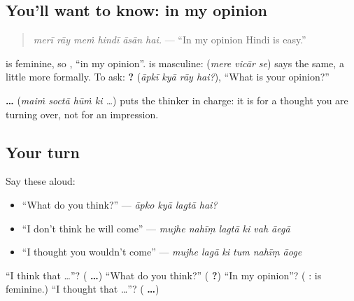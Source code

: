 \subsection*{You'll want to know: in my opinion}
\begin{quote}
\textbf{     }
\end{quote}

\begin{quote}
\emph{merī rāy meṁ hindī āsān hai.} — \textquotedblleft{}In my opinion Hindi is easy.\textquotedblright{}
\end{quote}

\textbf{} is feminine, so \textbf{  }, \textquotedblleft{}in my opinion\textquotedblright{}. \textbf{} is masculine: \textbf{  } (\emph{mere vicār se}) says the same, a little more formally. To ask: \textbf{   ?} (\emph{āpkī kyā rāy hai?}), \textquotedblleft{}What is your opinion?\textquotedblright{}

\textbf{    …} (\emph{maiṁ soctā hūṁ ki …}) puts the thinker in charge: it is for a thought you are turning over, not for an impression.

\subsection*{Your turn}
Say these aloud:

\begin{itemize}
\raggedright
  \item \textquotedblleft{}What do you think?\textquotedblright{} — \emph{āpko kyā lagtā hai?}
  \item \textquotedblleft{}I don't think he will come\textquotedblright{} — \emph{mujhe nahīṃ lagtā ki vah āegā}
  \item \textquotedblleft{}I thought you wouldn't come\textquotedblright{} — \emph{mujhe lagā ki tum nahīṃ āoge}
\end{itemize}

\begin{tcolorbox}[breakable,colback=teal!4,colframe=teal!35!black,title={Before you move on}]
\textquotedblleft{}I think that …\textquotedblright{}? (\textbf{    …}) \textquotedblleft{}What do you think?\textquotedblright{} (\textbf{   ?}) \textquotedblleft{}In my opinion\textquotedblright{}? (\textbf{  }: \textbf{} is feminine.) \textquotedblleft{}I thought that …\textquotedblright{}? (\textbf{   …})
\end{tcolorbox}
